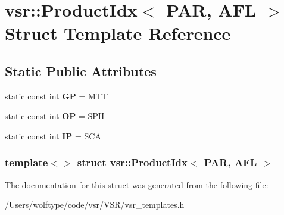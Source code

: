 \hypertarget{structvsr_1_1_product_idx_3_01_p_a_r_00_01_a_f_l_01_4}{\section{vsr\-:\-:Product\-Idx$<$ P\-A\-R, A\-F\-L $>$ Struct Template Reference}
\label{structvsr_1_1_product_idx_3_01_p_a_r_00_01_a_f_l_01_4}
}
\subsection*{Static Public Attributes}
\begin{DoxyCompactItemize}
\item 
\hypertarget{structvsr_1_1_product_idx_3_01_p_a_r_00_01_a_f_l_01_4_a39f17836d00fab502f4b0de254e0b76d}{static const int {\bfseries G\-P} = M\-T\-T}\label{structvsr_1_1_product_idx_3_01_p_a_r_00_01_a_f_l_01_4_a39f17836d00fab502f4b0de254e0b76d}

\item 
\hypertarget{structvsr_1_1_product_idx_3_01_p_a_r_00_01_a_f_l_01_4_a73f3cc21a1f5e81a6a61e480e201ab41}{static const int {\bfseries O\-P} = S\-P\-H}\label{structvsr_1_1_product_idx_3_01_p_a_r_00_01_a_f_l_01_4_a73f3cc21a1f5e81a6a61e480e201ab41}

\item 
\hypertarget{structvsr_1_1_product_idx_3_01_p_a_r_00_01_a_f_l_01_4_a94a49850983b2a9713fc27acfea51be1}{static const int {\bfseries I\-P} = S\-C\-A}\label{structvsr_1_1_product_idx_3_01_p_a_r_00_01_a_f_l_01_4_a94a49850983b2a9713fc27acfea51be1}

\end{DoxyCompactItemize}
\subsubsection*{template$<$$>$ struct vsr\-::\-Product\-Idx$<$ P\-A\-R, A\-F\-L $>$}



The documentation for this struct was generated from the following file\-:\begin{DoxyCompactItemize}
\item 
/\-Users/wolftype/code/vsr/\-V\-S\-R/vsr\-\_\-templates.\-h\end{DoxyCompactItemize}
